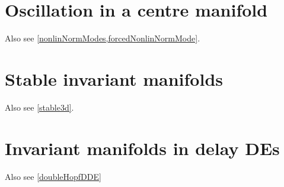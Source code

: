 \documentclass[11pt,a4paper]{refart}
\begin{document}
\section{Oscillation in a centre manifold}

Also see \cref{nonlinNormModes,forcedNonlinNormMode}.








\section{Stable invariant manifolds}

Also see \cref{stable3d}.




\section{Invariant manifolds in delay DEs}

Also see \cref{doubleHopfDDE}






\end{document}
